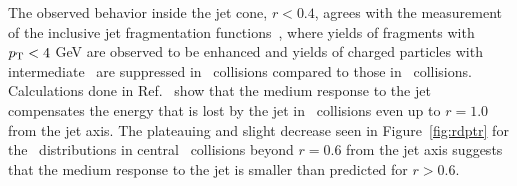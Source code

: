 The observed behavior inside the jet cone, $r < 0.4$, agrees with the measurement of the inclusive jet fragmentation functions~\cite{Aaboud:2017eww, Aaboud:2017bzv, PhysRevC.98.024908}, where yields of fragments with $\mbox{$p_{\mathrm{T}}$} < 4$ GeV are observed to be enhanced and yields of charged particles with intermediate \pT\ are suppressed in \PbPb\ collisions compared to those in \pp\ collisions.
Calculations done in Ref.~\cite{Tachibana:2017syd} show that the medium response to the jet compensates the energy that is lost by the jet in \pbpb\ collisions even up to $r = 1.0$ from the jet axis.
The plateauing and slight decrease seen in Figure~\ref{fig:rdptr} for the \RDptr\ distributions in central \pbpb\ collisions beyond $r = 0.6$ from the jet axis suggests that the medium response to the jet is smaller than predicted for $r > 0.6$.


